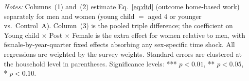\begin{table}[H]
   \par \raggedright 
   \footnotesize\textit{Notes:} Columns~(1) and~(2) estimate Eq.~\eqref{eq:did} (outcome home-based work) separately for men and women (young child $=$ aged 4 or younger vs.\ Control~A). Column~(3) is the pooled triple difference; the coefficient on Young child $\times$ Post $\times$ Female is the extra effect for women relative to men, with female-by-year-quarter fixed effects absorbing any sex-specific time shock. All regressions are weighted by the survey weights. Standard errors are clustered at the household level in parentheses. Significance levels: *** $p<0.01$, ** $p<0.05$, * $p<0.10$.
\end{table}


